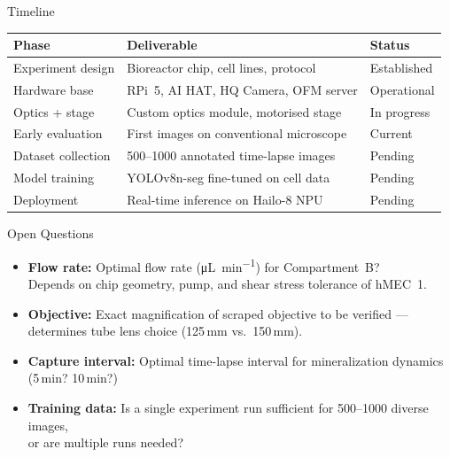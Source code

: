 \documentclass[aspectratio=169,11pt]{beamer}
\begin{document}
\begin{frame}{Timeline}

  \begin{tabular}{@{}lll@{}}
    \toprule
    \textbf{Phase} & \textbf{Deliverable} & \textbf{Status} \\
    \midrule
    Experiment design    & Bioreactor chip, cell lines, protocol          & Established \\
    Hardware base        & RPi~5, AI HAT, HQ Camera, OFM server          & Operational \\
    Optics + stage       & Custom optics module, motorised stage          & In progress \\
    Early evaluation     & First images on conventional microscope        & Current \\
    Dataset collection   & 500--1000 annotated time-lapse images          & Pending \\
    Model training       & YOLOv8n-seg fine-tuned on cell data            & Pending \\
    Deployment           & Real-time inference on Hailo-8 NPU             & Pending \\
    \bottomrule
  \end{tabular}

\end{frame}

\begin{frame}{Open Questions}

  \begin{itemize}
    \item \textbf{Flow rate:} Optimal flow rate (\si{\micro\liter\per\minute}) for Compartment~B?\\
          Depends on chip geometry, pump, and shear stress tolerance of hMEC~1.
    \item \textbf{Objective:} Exact magnification of scraped objective to be verified ---\\
          determines tube lens choice (125\,mm vs.\ 150\,mm).
    \item \textbf{Capture interval:} Optimal time-lapse interval for mineralization dynamics\\
          (5\,min? 10\,min?)
    \item \textbf{Training data:} Is a single experiment run sufficient for 500--1000 diverse images,\\
          or are multiple runs needed?
  \end{itemize}

\end{frame}
\end{document}
